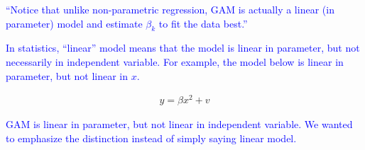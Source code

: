 \documentclass[
]{article}
\begin{document}
\begin{itemize}
\textcolor{blue}{``Notice that unlike non-parametric regression, GAM is actually a linear (in parameter) model and estimate $\beta_k$ to fit the data best.''}

\textcolor{blue}{In statistics, ``linear'' model means that the model is linear in parameter, but not necessarily in independent variable. For example, the model below is linear in parameter, but not linear in $x$.} 

\begin{align}
  y = \beta x^2 + v
\end{align}  

\textcolor{blue}{ GAM is linear in parameter, but not linear in independent variable. We wanted to emphasize the distinction instead of simply saying linear model.} 

\end{itemize}
\end{document}
